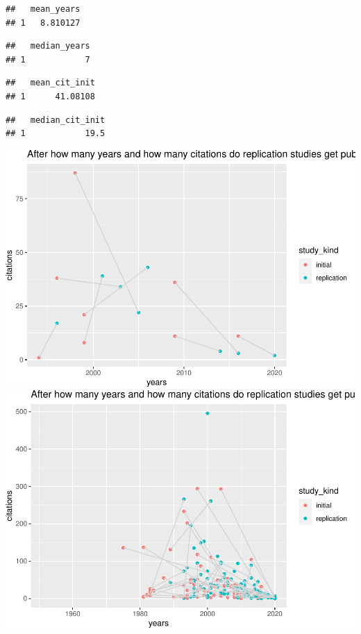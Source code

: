 \documentclass[]{elsarticle} %
\begin{document}
\begin{verbatim}
##   mean_years
## 1   8.810127
\end{verbatim}

\begin{verbatim}
##   median_years
## 1            7
\end{verbatim}

\begin{verbatim}
##   mean_cit_init
## 1      41.08108
\end{verbatim}

\begin{verbatim}
##   median_cit_init
## 1            19.5
\end{verbatim}

\includegraphics{ReplicationLing_files/figure-latex/plot cit and years direct-1.pdf}
\includegraphics{ReplicationLing_files/figure-latex/plot cit and years all-1.pdf}
\end{document}
